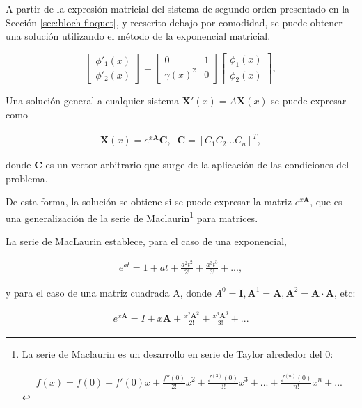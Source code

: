 A partir de la expresión matricial del sistema de segundo orden presentado en la Sección \ref{sec:bloch-floquet}, y reescrito debajo por comodidad, se puede obtener una solución utilizando el método de la exponencial matricial.

\begin{equation}
\begin{bmatrix}
\phi'_1(x) \\
\phi'_2(x)
\end{bmatrix}
=
\begin{bmatrix}
0 & 1 \\
\gamma(x)^2 & 0
\end{bmatrix}
\begin{bmatrix}
\phi_1(x) \\
\phi_2(x)
\end{bmatrix},
\end{equation}

Una solución general a cualquier sistema $\textbf{X}'(x) = A \textbf{X}(x)$ se puede expresar como

\begin{align}
	\textbf{X}(x) = e^{x\textbf{A}} \textbf{C}, \;\;\textbf{C} = [C_1 C_2 ... C_n ]^{T},
\end{align}

donde $\textbf{C}$ es un vector arbitrario que surge de la aplicación de las condiciones del problema.

De esta forma, la solución se obtiene si se puede expresar la matriz $e^{x\textbf{A}}$, que es una generalización de la serie de Maclaurin\footnote{La serie de Maclaurin es un desarrollo en serie de Taylor alrededor del 0: 

\begin{align}
	f(x) = f(0) + f'(0) x + \frac{f''(0)}{2!} x^2 + \frac{f^(3)(0)}{3!} x^3 + ... + \frac{f^(n)(0)}{n!} x^n + ...
\end{align}} para matrices.

La serie de MacLaurin establece, para el caso de una exponencial,

\begin{align}
	e^{at} = 1 + at + \frac{a^2 t^2}{2!} + \frac{a^3 t^3}{3!} + ...,
\end{align}

y para el caso de una matriz cuadrada A, donde $A^0 = \textbf{I}, \textbf{A}^1 = \textbf{A}, \textbf{A}^2 = \textbf{A} \cdot \textbf{A}$, etc:

\begin{align}
e^{x\textbf{A}} = I + x\textbf{A} + \frac{x^2 \textbf{A}^2}{2!} + \frac{x^3 \textbf{A}^3}{3!} + ...
\end{align}

